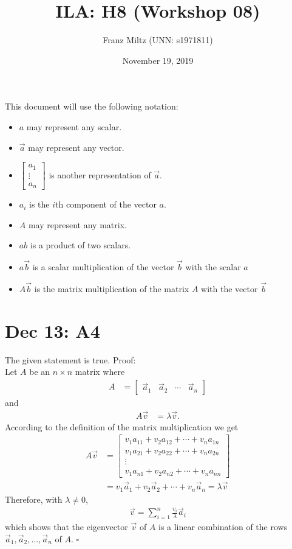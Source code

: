 \documentclass{article}
\title{ILA: H8 (Workshop 08)}
\author{Franz Miltz (UNN: s1971811)}
\date{November 19, 2019}
\begin{document}
\maketitle
This document will use the following notation:
\begin{itemize}
    \item $a$ may represent any scalar.
    \item $\vec{a}$ may represent any vector.
    \item $\begin{bmatrix}
        a_1\\
        \vdots\\
        a_n
    \end{bmatrix}$ is another representation of $\vec a$. 
    \item $a_i$ is the $i$th component of the vector $a$.
    \item $A$ may represent any matrix.
    \item $ab$ is a product of two scalars.
    \item $a\vec{b}$ is a scalar multiplication of the vector $\vec{b}$ with the scalar $a$
    \item $A\vec b$ is the matrix multiplication of the matrix $A$ with the vector $\vec b$
\end{itemize}
\section*{Dec 13: A4}
The given statement is true. Proof:\\
Let $A$ be an $n\times n$ matrix where
\begin{align*}
    A&=\begin{bmatrix}
        \vec a_1&\vec a_2&\cdots&\vec a_n
    \end{bmatrix}
\end{align*}
and
\begin{align*}
    A\vec v &= \lambda\vec v.
\end{align*}
According to the definition of the matrix multiplication we get
\begin{align*}
    A\vec v &= \begin{bmatrix}
        v_1a_{11} + v_2a_{12} + \cdots + v_na_{1n}\\
        v_1a_{21} + v_2a_{22} + \cdots + v_na_{2n}\\
        \vdots\\
        v_1a_{n1} + v_2a_{n2} + \cdots + v_na_{nn}
    \end{bmatrix}\\
    &= v_1\vec a_1 + v_2\vec a_2 + \cdots + v_n\vec a_n = \lambda \vec v
\end{align*}
Therefore, with $\lambda\not=0$,
\begin{align*}
    \vec v = \sum_{i=1}^n \frac{v_i}{\lambda} \vec a_i
\end{align*}
which shows that the eigenvector $\vec v$ of $A$ is a linear combination of the rows $\vec a_1, \vec a_2, ..., \vec a_n$ of $A$. $\square$
\end{document}
